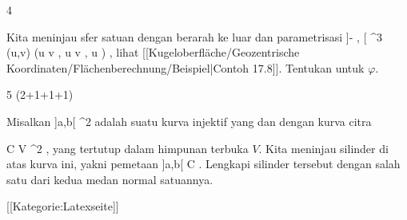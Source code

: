 {4}
{

Kita meninjau sfer satuan dengan
berarah ke luar dan parametrisasi
\maabbeledisp {\varphi} {{]{- {  }},  {  } [} \times {]{-\pi}, \pi[} } {\R^3
} {(u,v)} {(\cos  u  \cos  v  , \cos  u  \sin  v  , \sin  u )
} {,}
lihat
[[Kugeloberfläche/Geozentrische Koordinaten/Flächenberechnung/Beispiel|Contoh 17.8]].
Tentukan
untuk $\varphi$.

}
{} {}

{5 (2+1+1+1)}
{

Misalkan
\maabb {\gamma} {]a,b[} { \R^2
} {}
adalah suatu kurva injektif yang
dan
dengan kurva citra

\mavergleichskettedisp
{\vergleichskette
{ C
}
{ \subseteq} { V
}
{ \subseteq} { \R^2
}
{ } {
}
{ } {
}
}
{}{}{,}
yang tertutup dalam himpunan terbuka $V$. Kita meninjau silinder di atas kurva ini, yakni pemetaan
 {]a,b[ \times \R } { C \times \R
} {.}
Lengkapi silinder tersebut dengan salah satu dari kedua medan normal satuannya.

}
{} {}

 [[Kategorie:Latexseite]]
